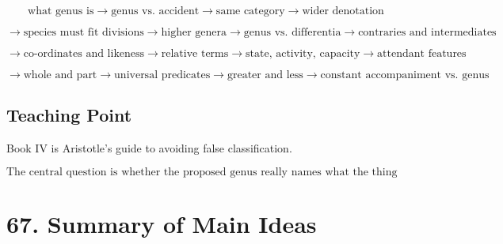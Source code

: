 \documentclass[12pt]{article}
\begin{document}
\[
\text{what genus is}
\rightarrow
\text{genus vs. accident}
\rightarrow
\text{same category}
\rightarrow
\text{wider denotation}
\]

\[
\rightarrow
\text{species must fit divisions}
\rightarrow
\text{higher genera}
\rightarrow
\text{genus vs. differentia}
\rightarrow
\text{contraries and intermediates}
\]

\[
\rightarrow
\text{co-ordinates and likeness}
\rightarrow
\text{relative terms}
\rightarrow
\text{state, activity, capacity}
\rightarrow
\text{attendant features}
\]

\[
\rightarrow
\text{whole and part}
\rightarrow
\text{universal predicates}
\rightarrow
\text{greater and less}
\rightarrow
\text{constant accompaniment vs. genus}
\]

\subsection*{Teaching Point}

Book IV is Aristotle's guide to avoiding false classification.

\[
\boxed{
\text{The central question is whether the proposed genus really names what the thing is broadly.}
}
\]

\section*{67. Summary of Main Ideas}
\end{document}
